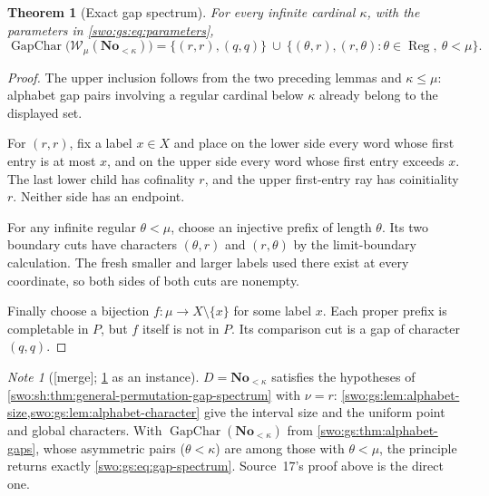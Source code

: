 \documentclass[11pt]{article}
\newtheorem{theorem}{Theorem}[section]
\theoremstyle{definition}
\theoremstyle{remark}
\newtheorem{note}[note]{Note}
\newcommand{\No}{\mathbf{No}}
\newcommand{\WO}{\mathcal W}
\newcommand{\merge}{\textsf{[merge]}}
\newcommand{\GapChar}{\operatorname{GapChar}}
\newcommand{\Reg}{\operatorname{Reg}}
\begin{document}
\begin{theorem}[Exact gap spectrum]\label{swo:gs:thm:gap-spectrum}
For every infinite cardinal $\kappa$, with the parameters in
\eqref{swo:gs:eq:parameters},
\[\tag{S17.5}\label{swo:gs:eq:gap-spectrum}
 \boxed{\displaystyle
 \GapChar\bigl(\WO_\mu(\No_{<\kappa})\bigr)
 =\{(r,r),(q,q)\}\ \cup\
 \{(\theta,r),(r,\theta):\theta\in\Reg,\ \theta<\mu\}.}
\]
\end{theorem}
\begin{proof}
The upper inclusion follows from the two preceding lemmas and
$\kappa\le\mu$: alphabet gap pairs involving a regular cardinal below
$\kappa$ already belong to the displayed set.

For $(r,r)$, fix a label $x\in X$ and place on the lower side every word
whose first entry is at most $x$, and on the upper side every word whose
first entry exceeds $x$. The last lower child has cofinality $r$, and the
upper first-entry ray has coinitiality $r$. Neither side has an endpoint.

For any infinite regular $\theta<\mu$, choose an injective prefix of
length $\theta$. Its two boundary cuts have characters $(\theta,r)$ and
$(r,\theta)$ by the limit-boundary calculation. The fresh smaller and
larger labels used there exist at every coordinate, so both sides of
both cuts are nonempty.

Finally choose a bijection $f:\mu\to X\setminus\{x\}$ for some label
$x$. Each proper prefix is completable in $P$, but $f$ itself is not in
$P$. Its comparison cut is a gap of character $(q,q)$.
\end{proof}

\begin{note}[\merge; \cref{swo:gs:thm:gap-spectrum} as an instance]\label{swo:vi:note:gs-instance}
$D=\No_{<\kappa}$ satisfies the hypotheses of
\cref{swo:sh:thm:general-permutation-gap-spectrum} with $\nu=r$:
\cref{swo:gs:lem:alphabet-size,swo:gs:lem:alphabet-character} give the interval
size and the uniform point and global characters. With
$\GapChar(\No_{<\kappa})$ from \cref{swo:gs:thm:alphabet-gaps}, whose
asymmetric pairs ($\theta<\kappa$) are among those with $\theta<\mu$, the
principle returns exactly \eqref{swo:gs:eq:gap-spectrum}. Source~17's proof
above is the direct one.
\end{note}
\end{document}
